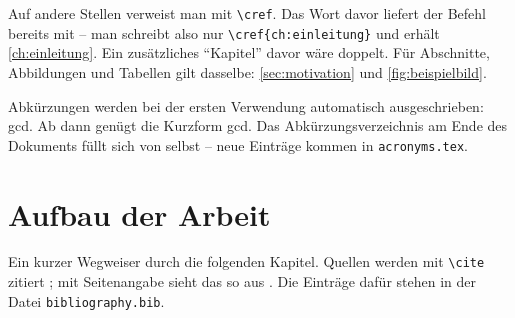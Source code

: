 Auf andere Stellen verweist man mit \verb|\cref|. Das Wort davor liefert der
Befehl bereits mit -- man schreibt also nur \verb|\cref{ch:einleitung}| und
erhält \cref{ch:einleitung}. Ein zusätzliches \enquote{Kapitel} davor wäre
doppelt. Für Abschnitte, Abbildungen und Tabellen gilt dasselbe:
\cref{sec:motivation} und \cref{fig:beispielbild}.


Abkürzungen werden bei der ersten Verwendung automatisch ausgeschrieben:
\acrfull{gcd}. Ab dann genügt die Kurzform \acrshort{gcd}. Das
Abkürzungsverzeichnis am Ende des Dokuments füllt sich von selbst -- neue
Einträge kommen in \texttt{acronyms.tex}.


\section{Aufbau der Arbeit}
\label{sec:aufbau}

Ein kurzer Wegweiser durch die folgenden Kapitel. Quellen werden mit
\verb|\cite| zitiert \cite{book_key}; mit Seitenangabe sieht das so
aus \cite[162]{book_key}. Die Einträge dafür stehen in der Datei
\texttt{bibliography.bib}.

\lipsum[2] %
